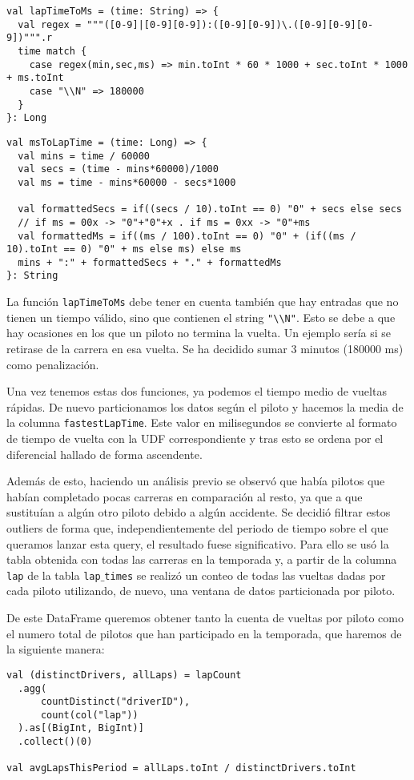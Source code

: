 \documentclass[12pt,twoside,titlepage]{report}
\begin{document}
\begin{lstlisting}
val lapTimeToMs = (time: String) => {
  val regex = """([0-9]|[0-9][0-9]):([0-9][0-9])\.([0-9][0-9][0-9])""".r
  time match {
    case regex(min,sec,ms) => min.toInt * 60 * 1000 + sec.toInt * 1000 + ms.toInt
    case "\\N" => 180000
  }  
}: Long
  \end{lstlisting}

\begin{lstlisting}
val msToLapTime = (time: Long) => {
  val mins = time / 60000
  val secs = (time - mins*60000)/1000
  val ms = time - mins*60000 - secs*1000
    
  val formattedSecs = if((secs / 10).toInt == 0) "0" + secs else secs
  // if ms = 00x -> "0"+"0"+x . if ms = 0xx -> "0"+ms
  val formattedMs = if((ms / 100).toInt == 0) "0" + (if((ms / 10).toInt == 0) "0" + ms else ms) else ms
  mins + ":" + formattedSecs + "." + formattedMs    
}: String
\end{lstlisting}

La función \texttt{lapTimeToMs} debe tener en cuenta también que hay entradas que no tienen un tiempo válido, sino que contienen el string \texttt{"\textbackslash\textbackslash N"}. Esto se debe a que hay ocasiones en los que un piloto no termina la vuelta. Un ejemplo sería si se retirase de la carrera en esa vuelta. Se ha decidido sumar 3 minutos (180000 ms) como penalización.

Una vez tenemos estas dos funciones, ya podemos el tiempo medio de vueltas rápidas. De nuevo particionamos los datos según el piloto y hacemos la media de la columna \texttt{fastestLapTime}. Este valor en milisegundos se convierte al formato de tiempo de vuelta con la UDF correspondiente y tras esto se ordena por el diferencial hallado de forma ascendente.

Además de esto, haciendo un análisis previo se observó que había pilotos que habían completado pocas carreras en comparación al resto, ya que a que sustituían a algún otro piloto debido a algún accidente. Se decidió filtrar estos outliers de forma que, independientemente del periodo de tiempo sobre el que queramos lanzar esta query, el resultado fuese significativo. Para ello se usó la tabla obtenida con todas las carreras en la temporada y, a partir de la columna \texttt{lap} de la tabla \texttt{lap$\_$times} se realizó un conteo de todas las vueltas dadas por cada piloto utilizando, de nuevo, una ventana de datos particionada por piloto.

De este DataFrame queremos obtener tanto la cuenta de vueltas por piloto como el numero total de pilotos que han participado en la temporada, que haremos de la siguiente manera:
\begin{lstlisting}
val (distinctDrivers, allLaps) = lapCount
  .agg(
      countDistinct("driverID"),
      count(col("lap"))
  ).as[(BigInt, BigInt)]
  .collect()(0)

val avgLapsThisPeriod = allLaps.toInt / distinctDrivers.toInt
\end{lstlisting}
\end{document}
